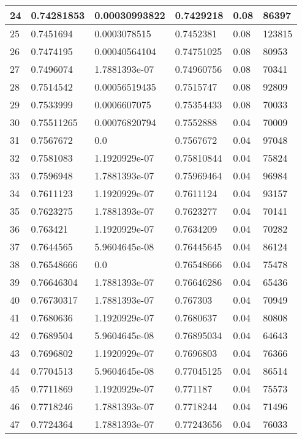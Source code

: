 \begin{longtable}{|l|l|l|l|l|l|}
24 & 0.74281853 & 0.00030993822 & 0.7429218 & 0.08 & 86397 \\ \hline 
25 & 0.7451694 & 0.0003078515 & 0.7452381 & 0.08 & 123815 \\ \hline 
26 & 0.7474195 & 0.00040564104 & 0.74751025 & 0.08 & 80953 \\ \hline 
27 & 0.7496074 & 1.7881393e-07 & 0.74960756 & 0.08 & 70341 \\ \hline 
28 & 0.7514542 & 0.00056519435 & 0.7515747 & 0.08 & 92809 \\ \hline 
29 & 0.7533999 & 0.0006607075 & 0.75354433 & 0.08 & 70033 \\ \hline 
30 & 0.75511265 & 0.00076820794 & 0.7552888 & 0.04 & 70009 \\ \hline 
31 & 0.7567672 & 0.0 & 0.7567672 & 0.04 & 97048 \\ \hline 
32 & 0.7581083 & 1.1920929e-07 & 0.75810844 & 0.04 & 75824 \\ \hline 
33 & 0.7596948 & 1.7881393e-07 & 0.75969464 & 0.04 & 96984 \\ \hline 
34 & 0.7611123 & 1.1920929e-07 & 0.7611124 & 0.04 & 93157 \\ \hline 
35 & 0.7623275 & 1.7881393e-07 & 0.7623277 & 0.04 & 70141 \\ \hline 
36 & 0.763421 & 1.1920929e-07 & 0.7634209 & 0.04 & 70282 \\ \hline 
37 & 0.7644565 & 5.9604645e-08 & 0.76445645 & 0.04 & 86124 \\ \hline 
38 & 0.76548666 & 0.0 & 0.76548666 & 0.04 & 75478 \\ \hline 
39 & 0.76646304 & 1.7881393e-07 & 0.76646286 & 0.04 & 65436 \\ \hline 
40 & 0.76730317 & 1.7881393e-07 & 0.767303 & 0.04 & 70949 \\ \hline 
41 & 0.7680636 & 1.1920929e-07 & 0.7680637 & 0.04 & 80808 \\ \hline 
42 & 0.7689504 & 5.9604645e-08 & 0.76895034 & 0.04 & 64643 \\ \hline 
43 & 0.7696802 & 1.1920929e-07 & 0.7696803 & 0.04 & 76366 \\ \hline 
44 & 0.7704513 & 5.9604645e-08 & 0.77045125 & 0.04 & 86514 \\ \hline 
45 & 0.7711869 & 1.1920929e-07 & 0.771187 & 0.04 & 75573 \\ \hline 
46 & 0.7718246 & 1.7881393e-07 & 0.7718244 & 0.04 & 71496 \\ \hline 
47 & 0.7724364 & 1.7881393e-07 & 0.77243656 & 0.04 & 76033 \\ \hline 

\end{longtable}
